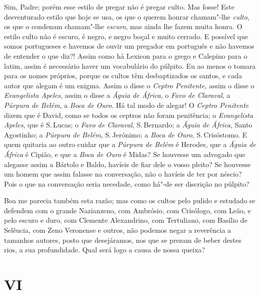 Sim, Padre; porém esse estilo de pregar não é pregar culto. Mas fosse!
Este desventurado estilo que hoje se usa, os que o querem honrar
chamam"-lhe \emph{culto}, os que o condenam chamam"-lhe \emph{escuro},
mas ainda lhe fazem muita honra. O estilo culto não é escuro, é negro, e
negro boçal e muito cerrado. E possível que somos portugueses e
havemos de ouvir um pregador em português e não havemos de entender o
que diz?! Assim como há Lexicon para o grego e Calepino para o latim,
assim é necessário haver um vocabulário do púlpito. Eu ao menos o tomara
para os nomes próprios, porque os cultos têm desbaptizados os santos,
e cada autor que alegam é um enigma. Assim o disse o \emph{Ceptro
Penitente}, assim o disse o \emph{Evangelista Apeles}, assim o disse a
\emph{Águia de África}, o \emph{Favo de Claraval}, a \emph{Púrpura de
Belém}, a \emph{Boca de Ouro}. Há tal modo de alegar! O \emph{Ceptro
Penitente} dizem que é David, como se todos os ceptros não foram
penitência; o \emph{Evangelista Apeles}, que é S.\,Lucas; o \emph{Favo de
Claraval}, S.\,Bernardo; a \emph{Águia de África}, Santo Agostinho; a
\emph{Púrpura de Belém}, S.\,Jerónimo; a \emph{Boca de Ouro}, S.\,Crisóstomo. E quem quitaria ao outro cuidar que a \emph{Púrpura de
Belém} é Herodes, que a \emph{Águia de África} é Cipião, e que a
\emph{Boca de Ouro} é Midas? Se houvesse um advogado que alegasse assim
a Bártolo e Baldo, havíeis de fiar dele o vosso pleito? Se houvesse um
homem que assim falasse na conversação, não o havíeis de ter por
néscio? Pois o que na conversação seria necedade, como há"-de ser
discrição no púlpito?

Boa me parecia também esta razão; mas como os cultos pelo
pulido e estudado se defendem com o grande Nazianzeno, com Ambrósio, com
Crisólogo, com Leão, e pelo escuro e duro, com Clemente Alexandrino, com
Tertuliano, com Basílio de Selêucia, com Zeno Veronense e outros, não
podemos negar a reverência a
tamanhos autores, posto que desejáramos, nos que se prezam de beber
destes rios, a sua profundidade. Qual será logo a causa de nossa queixa?

\section*{VI}

